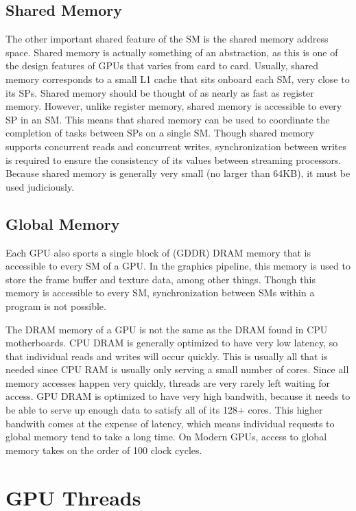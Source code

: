 \documentclass[12pt,twoside]{reedthesis}
\begin{document}
\subsection{Shared Memory}

The other important shared feature of the SM is the shared memory address space. Shared memory is actually something of an abstraction, as this is one of the design features of GPUs that varies from card to card. Usually, shared memory corresponds to a small L1 cache that sits onboard each SM, very close to its SPs. Shared memory should be thought of as nearly as fast as register memory. However, unlike register memory, shared memory is accessible to every SP in an SM. This means that shared memory can be used to coordinate the completion of tasks between SPs on a single SM. Though shared memory supports concurrent reads and concurrent writes, synchronization between writes is required to ensure the consistency of its values between streaming processors. Because shared memory is generally very small (no larger than 64KB), it must be used judiciously.

\subsection{Global Memory}
\label{globalmem}

Each GPU also sports a single block of (GDDR) DRAM memory that is accessible to every SM of a GPU. In the graphics pipeline, this memory is used to store the frame buffer and texture data, among other things. Though this memory is accessible to every SM, synchronization between SMs within a program is not possible.

The DRAM memory of a GPU is not the same as the DRAM found in CPU motherboards. CPU DRAM is generally optimized to have very low latency, so that individual reads and writes will occur quickly. This is usually all that is needed since CPU RAM is usually only serving a small number of cores. Since all memory accesses happen very quickly, threads are very rarely left waiting for access. GPU DRAM is optimized to have very high bandwith, because it needs to be able to serve up enough data to satisfy all of its 128+ cores. This higher bandwith comes at the expense of latency, which means individual requests to global memory tend to take a long time. On Modern GPUs, access to global memory takes on the order of 100 clock cycles.

\section{GPU Threads}
\end{document}
